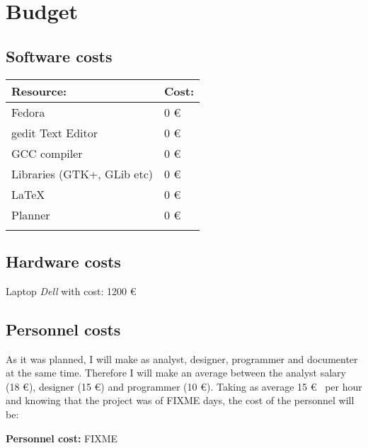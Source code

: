 
\chapter{Budget}


\section{Software costs}\label{sec:SoftwareCosts}

\begin{center}
  \begin{tabularx}{0.75\textwidth}{|X|X|}
    \firsthline
    \textbf{Resource:} & \textbf{Cost:} \\
    \hline
    Fedora & 0 \euro \\
    \hline
    gedit Text Editor & 0 \euro \\
    \hline
    GCC compiler & 0 \euro \\
    \hline
    Libraries (GTK+, GLib etc) & 0 \euro \\
    \hline
    \LaTeX & 0 \euro \\
    \hline
    Planner & 0 \euro \\
    \lasthline
  \end{tabularx}
\end{center}

\section{Hardware costs}\label{sec:HardwareCosts}

Laptop \emph{Dell} with cost: 1200 \euro

\section{Personnel costs}\label{sec:PersonnelCosts}

As it was planned, I will make as analyst, designer, programmer and documenter at the same time. Therefore I will make an average between the analyst salary (18 \euro), designer (15 \euro) and programmer (10 \euro). Taking as average 15 \euro~ per hour and knowing that the project was of FIXME days, the cost of the personnel will be:

\textbf{Personnel cost:} FIXME
